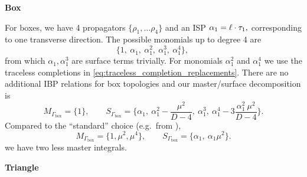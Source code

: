 \textbf{Box}

For boxes, we have  4 propagators $\{\rho_1,\ldots{}\rho_4\}$ and an ISP $ \alpha_1 = \sp(\ell,\tau_1), $
corresponding to one transverse direction.
The possible monomials up to degree 4 are 
\[
  \{1,~\alpha_1,~\alpha_1^2,~\alpha_1^3,~\alpha_1^4\},~
\]
from which $\alpha_1,\alpha_1^3$ are surface terms trivially.
For monomials $\alpha_1^2$ and $\alpha_1^4$ we use the traceless completions in
\cref{eq:traceless_completion_replacements}. There are no additional IBP relations for box topologies and
our master/surface decomposition is
\[
  M_{\Gamma_\text{box} } = \{1\}, \qquad S_{\Gamma_\text{box} } = \{\alpha_1,~ \alpha_1^2 - \frac{\mu^2}{D-4},~ \alpha_1^3,~ \alpha_1^4 - 3 \frac{\alpha_1^2~\mu^2}{D-4}\}.
\]
Compared to the ``standard'' choice (e.g.\ from \cite{Giele:2008ve}),
\[
  M_{\Gamma_\text{box} } = \{1, \mu^2, \mu^4\}, \qquad S_{\Gamma_\text{box} } = \{\alpha_1,~ \alpha_1 \mu^2 \}.
\]
we have two less master integrals.



\textbf{Triangle}

